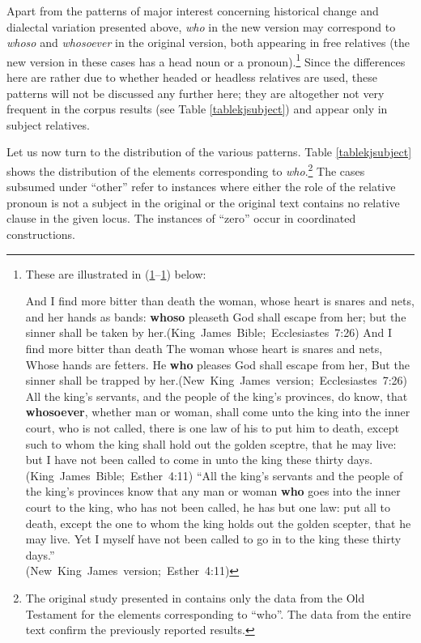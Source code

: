Apart from the patterns of major interest concerning historical change and dialectal variation presented above, \textit{who} in the new version may correspond to \textit{whoso} and \textit{whosoever} in the original version, both appearing in free relatives (the new version in these cases has a head noun or a pronoun).\footnote{These are illustrated in (\ref{whosokj}--\ref{whosoevernkjv}) below:

\eanoraggedright \label{whosokj}
And I find more bitter than death the woman, whose heart is snares and nets, and her hands as bands: \textbf{whoso} pleaseth God shall escape from her; but the sinner shall be taken by her.\hbox{}\hfill\hbox{(King James Bible; Ecclesiastes 7:26)}
\ex And I find more bitter than death The woman whose heart is snares and nets, Whose hands are fetters. He \textbf{who} pleases God shall escape from her, But the sinner shall be trapped by her.\hbox{}\hfill\hbox{(New King James version; Ecclesiastes 7:26)}
\ex All the king's servants, and the people of the king's provinces, do know, that \textbf{whosoever}, whether man or woman, shall come unto the king into the inner court, who is not called, there is one law of his to put him to death, except such to whom the king shall hold out the golden sceptre, that he may live: but I have not been called to come in unto the king these thirty days.\hbox{}\hfill\hbox{(King James Bible; Esther 4:11)}
\ex \label{whosoevernkjv} ``All the king's servants and the people of the king's provinces know that any man or woman \textbf{who} goes into the inner court to the king, who has not been called, he has but one law: put all to death, except the one to whom the king holds out the golden scepter, that he may live. Yet I myself have not been called to go in to the king these thirty days.''\\\hbox{}\hfill\hbox{(New King James version; Esther 4:11)}
\z}
Since the differences here are rather due to whether headed or headless relatives are used, these patterns will not be discussed any further here; they are altogether not very frequent in the corpus results (see Table \ref{tablekjsubject}) and appear only in subject relatives.

Let us now turn to the distribution of the various patterns. Table \ref{tablekjsubject} shows the distribution of the elements corresponding to \textit{who}.\footnote{The original study presented in \citet[100]{bacskaiatkari2020lmec} contains only the data from the Old Testament for the elements corresponding to ``who''. The data from the entire text confirm the previously reported results.} The cases subsumed under ``other'' refer to instances where either the role of the relative pronoun is not a subject in the original or the original text contains no relative clause in the given locus. The instances of ``zero'' occur in coordinated constructions.

